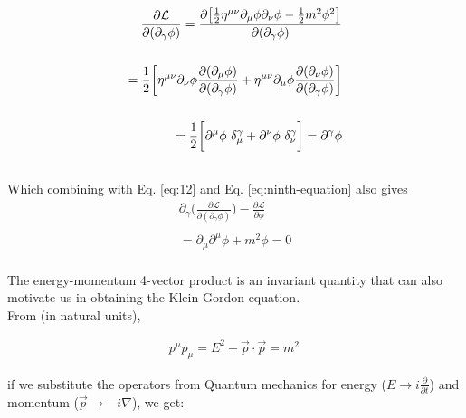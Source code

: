 \documentclass[aps,secnumarabic,nobalancelastpage,amsmath,amssymb,
nofootinbib]{revtex4}
\newcommand{\Lagr}{\mathcal{L}}
\begin{document}
\begin{equation}
\begin{split}
\frac{\partial \Lagr}{\partial (\partial_\gamma \phi)} = \frac{\partial \big[\frac{1}{2} \eta^{\mu\nu} \partial_\mu \phi \partial_\nu \phi - \frac{1}{2} m^2 \phi^2\big]\normalfont}{\partial (\partial_\gamma \phi)} \\
\\ 
=\frac{1}{2} \bigg[ \eta^{\mu\nu} \partial_\nu \phi \frac{\partial ( \partial_\mu \phi)}{\partial (\partial_\gamma \phi)} + \eta^{\mu\nu}\partial_\mu \phi \frac{\partial (\partial_\nu \phi)}{\partial (\partial_\gamma \phi)}\bigg]\\
\\
=\frac{1}{2} \bigg[\partial^\mu \phi \ \delta_\mu^\gamma + \partial^\nu \phi \ \delta_\nu^\gamma \bigg]
=\partial^\gamma \phi\\
\\
\end{split}
\end{equation}
\noindent Which combining with Eq. \ref{eq:12} and Eq. \ref{eq:ninth-equation}  also gives \\
\begin{equation}
\begin{split}
 \partial_\gamma \bigg(\frac{ \partial \Lagr}{ \partial (\partial_\gamma \phi) }\bigg)-\frac{ \partial \Lagr}{ \partial \phi} \\
\\
=  \partial_\mu \partial^\mu \phi + m^2\phi =0\\
\, \label{eq:17}
\end{split}
\end{equation}



The energy-momentum 4-vector product is an invariant quantity that can also motivate us in obtaining the Klein-Gordon equation.\\

\noindent From (in natural units),

\begin{equation}
\begin{split}
p^\mu p_\mu=E^2-\vec{p}\cdot\vec{p}=m^2
\, \label{eq:18}
\end{split}
\end{equation}

if we substitute the operators from Quantum mechanics for energy ($E \rightarrow i \frac{\partial}{\partial t}$) and momentum ($\vec{p} \rightarrow - i \nabla$), we get:
\end{document}
